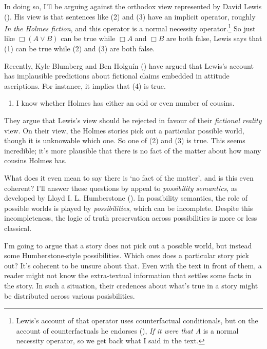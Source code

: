 \documentclass[
  11pt,
  letterpaper,
  DIV=11,
  numbers=noendperiod,
  twoside]{scrartcl}
\providecommand{\tightlist}{%
  \setlength{\itemsep}{0pt}\setlength{\parskip}{0pt}}
\begin{document}
In doing so, I'll be arguing against the orthodox view represented by
David Lewis (). His view is that
sentences like (2) and (3) have an implicit operator, roughly \emph{In
the Holmes fiction}, and this operator is a normal necessity
operator.\footnote{Lewis's account of that operator uses counterfactual
  conditionals, but on the account of counterfactuals he endorses
  (), \emph{If it were that A} is a
  normal necessity operator, so we get back what I said in the text.} So
just like \(\Box (A \vee B)\) can be true while \(\Box A\) and
\(\Box B\) are both false, Lewis says that (1) can be true while (2) and
(3) are both false.

Recently, Kyle Blumberg and Ben Holguín
() have argued that Lewis's
account has implausible predictions about fictional claims embedded in
attitude ascriptions. For instance, it implies that (4) is true.

\begin{enumerate}
\def\labelenumi{(\arabic{enumi})}
\setcounter{enumi}{3}
\tightlist
\item
  I know whether Holmes has either an odd or even number of cousins.
\end{enumerate}

They argue that Lewis's view should be rejected in favour of their
\emph{fictional reality} view. On their view, the Holmes stories pick
out a particular possible world, though it is unknowable which one. So
one of (2) and (3) is true. This seems incredible; it's more plausible
that there is no fact of the matter about how many cousins Holmes has.

What does it even mean to say there is `no fact of the matter', and is
this even coherent? I'll answer these questions by appeal to
\emph{possibility semantics}, as developed by Lloyd I. L. Humberstone
(). In possibility semantics, the
role of possible worlds is played by \emph{possibilities}, which can be
incomplete. Despite this incompleteness, the logic of truth preservation
across possibilities is more or less classical.

I'm going to argue that a story does not pick out a possible world, but
instead some Humberstone-style possibilities. Which ones does a
particular story pick out? It's coherent to be unsure about that. Even
with the text in front of them, a reader might not know the
extra-textual information that settles some facts in the story. In such
a situation, their credences about what's true in a story might be
distributed across various posisbilities.
\end{document}
